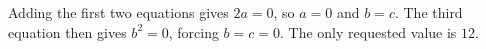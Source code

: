 Adding the first two equations gives $2a=0$, so $a=0$ and $b=c$. The third equation then gives $b^2=0$, forcing $b=c=0$. The only requested value is $\boxed{12}$.
